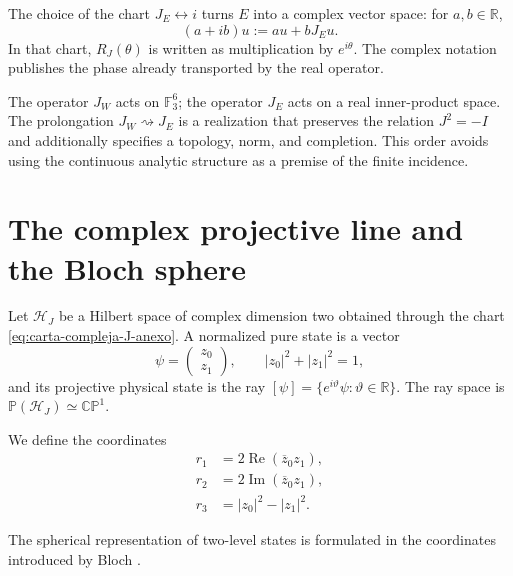 The choice of the chart \(J_E\leftrightarrow i\) turns \(E\) into a
complex vector space: for \(a,b\in\mathbb R\),
\begin{equation}
 (a+ib)u:=au+bJ_Eu.
 \label{eq:carta-compleja-J-anexo}
\end{equation}
In that chart, \(R_J(\theta)\) is written as multiplication by
\(e^{i\theta}\). The complex notation publishes the phase already transported by the real
operator.

\begin{remark}
The operator \(J_W\) acts on \(\mathbb F_3^6\); the operator
\(J_E\) acts on a real inner-product space. The prolongation
\(J_W\rightsquigarrow J_E\) is a realization that preserves the relation
\(J^2=-I\) and additionally specifies a topology, norm, and completion.
This order avoids using the continuous analytic structure as a premise of
the finite incidence.
\end{remark}

\section{The complex projective line and the Bloch sphere}

Let \(\mathcal H_J\) be a Hilbert space of complex dimension two obtained
through the chart \eqref{eq:carta-compleja-J-anexo}. A normalized pure state
is a vector
\begin{equation}
 \psi=\begin{pmatrix}z_0\\ z_1\end{pmatrix},
 \qquad |z_0|^2+|z_1|^2=1,
 \label{eq:espinor-normalizado-anexo}
\end{equation}
and its projective physical state is the ray
\([\psi]=\{e^{i\vartheta}\psi:\vartheta\in\mathbb R\}\).
The ray space is \(\mathbb P(\mathcal H_J)\simeq\mathbb{CP}^{1}\).

We define the coordinates
\begin{equation}
 \begin{aligned}
 r_1&=2\operatorname{Re}(\overline z_0z_1),\\
 r_2&=2\operatorname{Im}(\overline z_0z_1),\\
 r_3&=|z_0|^2-|z_1|^2.
 \end{aligned}
 \label{eq:coordenadas-bloch-anexo}
\end{equation}

The spherical representation of two-level states is formulated in the
coordinates introduced by Bloch \cite{Bloch1946}.


